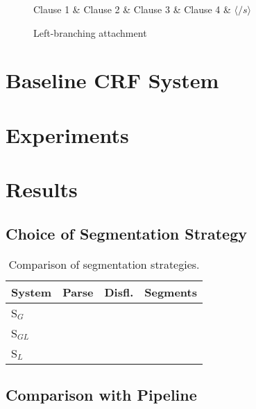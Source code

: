 \documentclass[11pt,letterpaper]{article}
\begin{document}
\begin{figure}
\begin{dependency}[theme=simple, segmented edge]
    \begin{deptext}[column sep=.075cm, row sep=.1ex]
    Clause 1 \& Clause 2 \& Clause 3 \& Clause 4 \& $\langle /s \rangle$ \\
    \end{deptext}
    \end{dependency}
    \caption{Left-branching attachment}
\end{figure}

\clearpage
\section{Baseline CRF System}

\section{Experiments}

\section{Results}

\subsection{Choice of Segmentation Strategy}

\begin{table}
    \centering
    \small
    \begin{tabular}{l|rrr}
        System & Parse & Disfl. & Segments \\
        \hline \hline
        S$_G$ & & & \\
        S$_{GL}$  & & & \\
        S$_L$  & & & \\
        \hline
    \end{tabular}
    \caption{\small Comparison of segmentation strategies.}
\end{table}


\subsection{Comparison with Pipeline}
\end{document}
